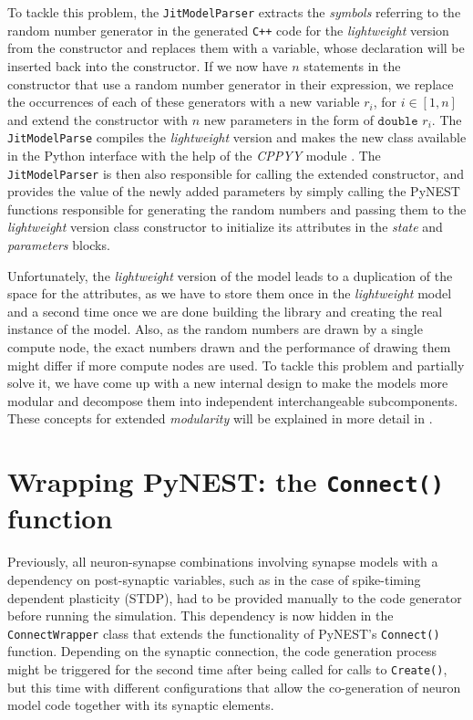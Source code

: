 To tackle this problem, the \texttt{JitModelParser} extracts the \emph{symbols} referring to the random number generator in the generated \texttt{C++} code for the \emph{lightweight} version from the constructor and replaces them with a variable, whose declaration will be inserted back into the constructor. If we now have $n$ statements in the constructor that use a random number generator in their expression, we replace the occurrences of each of these generators with a new variable $r_i$, for $i \in [1, n]$ and extend the constructor with $n$ new parameters in the form of $\texttt{double } r_i$. The \texttt{JitModelParse} compiles the \emph{lightweight} version and makes the new class available in the Python interface with the help of the \emph{CPPYY} module \citep{cppyy}. The \texttt{JitModelParser} is then also responsible for calling the extended constructor, and provides the value of the newly added parameters by simply calling the PyNEST functions responsible for generating the random numbers and passing them to the \emph{lightweight} version class constructor to initialize its attributes in the \emph{state} and \emph{parameters} blocks.

Unfortunately, the \emph{lightweight} version of the model leads to a duplication of the space for the attributes, as we have to store them once in the \emph{lightweight} model and a second time once we are done building the library and creating the real instance of the model. Also, as the random numbers are drawn by a single compute node, the exact numbers drawn and the performance of drawing them might differ if more compute nodes are used. To tackle this problem and partially solve it, we have come up with a new internal design to make the models more modular and decompose them into independent interchangeable subcomponents. These concepts for extended \emph{modularity} will be explained in more detail in .

\section{Wrapping PyNEST: the \texttt{Connect()} function}

Previously, all neuron-synapse combinations involving synapse models with a dependency on post-synaptic variables, such as in the case of spike-timing dependent plasticity (STDP), had to be provided manually to the code generator before running the simulation. This dependency is now hidden in the \texttt{ConnectWrapper} class that extends the functionality of PyNEST's \texttt{Connect()} function. Depending on the synaptic connection, the code generation process might be triggered for the second time after being called for calls to \texttt{Create()}, but this time with different configurations that allow the co-generation of neuron model code together with its synaptic elements.

